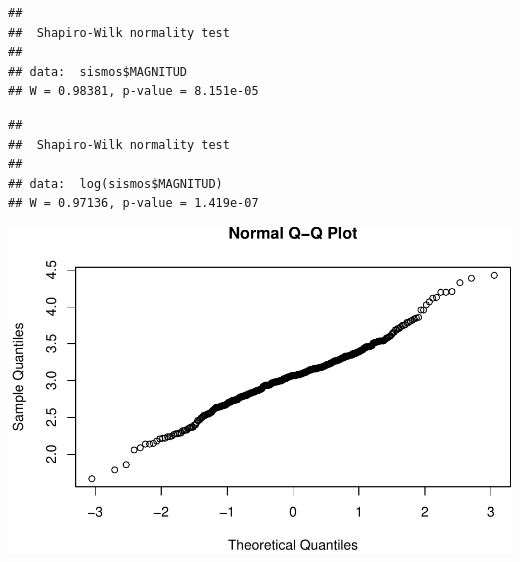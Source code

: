 \documentclass[11pt,]{article}
\newenvironment{Shaded}{\begin{snugshade}}{\end{snugshade}}
\newcommand{\KeywordTok}[1]{\textcolor[rgb]{0.13,0.29,0.53}{\textbf{#1}}}
\newcommand{\OperatorTok}[1]{\textcolor[rgb]{0.81,0.36,0.00}{\textbf{#1}}}
\newcommand{\NormalTok}[1]{#1}
\begin{document}
\begin{verbatim}
## 
##  Shapiro-Wilk normality test
## 
## data:  sismos$MAGNITUD
## W = 0.98381, p-value = 8.151e-05
\end{verbatim}

\begin{Shaded}
\end{Shaded}

\begin{verbatim}
## 
##  Shapiro-Wilk normality test
## 
## data:  log(sismos$MAGNITUD)
## W = 0.97136, p-value = 1.419e-07
\end{verbatim}

\begin{Shaded}
\end{Shaded}

\includegraphics{proyecto_files/figure-latex/unnamed-chunk-7-3.pdf}

\begin{Shaded}
\end{Shaded}
\end{document}

